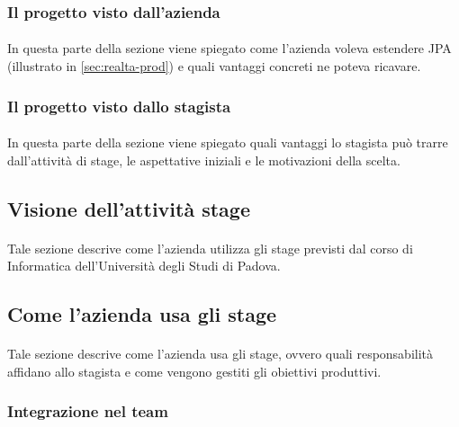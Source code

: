 \documentclass[
article,
10pt, %
oneside, %
BCOR5mm, %
]{scrartcl}
\begin{document}
\subsubsection{Il progetto visto dall'azienda}

\paragraph{} In questa parte della sezione viene spiegato come l'azienda
voleva estendere JPA (illustrato in \ref{sec:realta-prod}) e quali vantaggi
concreti ne poteva ricavare.

\subsubsection{Il progetto visto dallo stagista}

\paragraph{} In questa parte della sezione viene spiegato quali vantaggi lo
stagista può trarre dall'attività di stage, le aspettative iniziali e le
motivazioni della scelta.

\subsection{Visione dell'attività stage}

\paragraph{} Tale sezione descrive come l'azienda utilizza gli stage previsti
dal corso di Informatica dell'Università degli Studi di Padova.

\subsection{Come l'azienda usa gli stage}

\paragraph{} Tale sezione descrive come l'azienda usa gli stage, ovvero quali
responsabilità affidano allo stagista e come vengono gestiti gli obiettivi
produttivi.

\subsubsection{Integrazione nel team}
\end{document}
